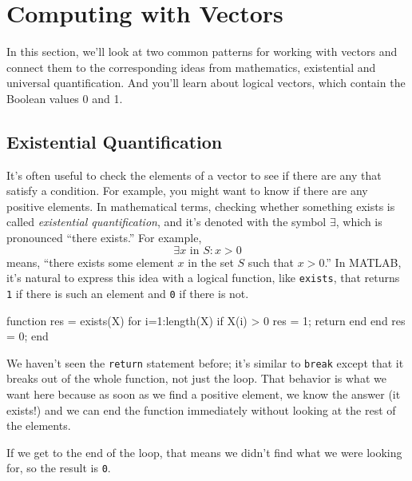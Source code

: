 \section{Computing with Vectors}

In this section, we'll look at two common patterns for working with vectors and connect them to the corresponding ideas from mathematics, existential and universal quantification.  And you'll learn about logical vectors, which contain the Boolean values 0 and 1.

\subsection{Existential Quantification}


It's often useful to check the elements of a vector to see if there
are any that satisfy a condition.  For example, you might want to
know if there are any positive elements.  In mathematical terms, checking whether something exists is called \emph{existential quantification}, and it's denoted with
the symbol $\exists$, which is pronounced ``there exists.''  For example,
%
\[ \exists x \mbox{~in~} S: x>0  \]
%
means, ``there exists some element $x$ in the set $S$ such that
$x>0$.''  In MATLAB, it's natural to express this idea with a logical
function, like \lstinline{exists}, that returns \lstinline{1} if there is such an
element and \lstinline{0} if there is not.

\begin{code}
function res = exists(X)
    for i=1:length(X)
        if X(i) > 0
            res = 1;
            return
        end
    end
    res = 0;
end
\end{code}

We haven't seen the \lstinline{return} statement before; it's similar
to \lstinline{break} except that it breaks out of the whole function, not
just the loop.  That behavior is what we want here because as soon
as we find a positive element, we know the answer (it exists!) and
we can end the function immediately without looking at the rest
of the elements.


If we get to the end of the loop, that means we didn't find what
we were looking for, so the result is \lstinline{0}.

